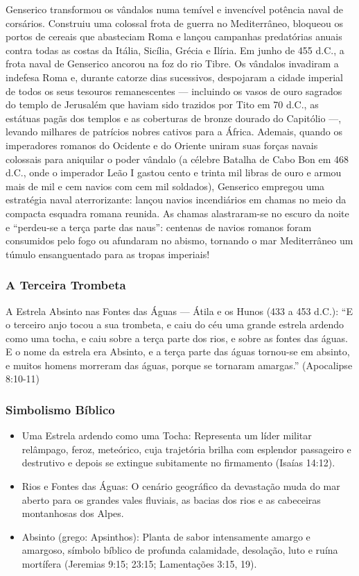 Genserico transformou os vândalos numa temível e invencível potência naval de corsários. Construiu uma colossal frota de guerra no Mediterrâneo, bloqueou os portos de cereais que abasteciam Roma e lançou campanhas predatórias anuais contra todas as costas da Itália, Sicília, Grécia e Ilíria.
Em junho de 455 d.C., a frota naval de Genserico ancorou na foz do rio Tibre. Os vândalos invadiram a indefesa Roma e, durante catorze dias sucessivos, despojaram a cidade imperial de todos os seus tesouros remanescentes — incluindo os vasos de ouro sagrados do templo de Jerusalém que haviam sido trazidos por Tito em 70 d.C., as estátuas pagãs dos templos e as coberturas de bronze dourado do Capitólio —, levando milhares de patrícios nobres cativos para a África.
Ademais, quando os imperadores romanos do Ocidente e do Oriente uniram suas forças navais colossais para aniquilar o poder vândalo (a célebre Batalha de Cabo Bon em 468 d.C., onde o imperador Leão I gastou cento e trinta mil libras de ouro e armou mais de mil e cem navios com cem mil soldados), Genserico empregou uma estratégia naval aterrorizante: lançou navios incendiários em chamas no meio da compacta esquadra romana reunida. As chamas alastraram-se no escuro da noite e ``perdeu-se a terça parte das naus'': centenas de navios romanos foram consumidos pelo fogo ou afundaram no abismo, tornando o mar Mediterrâneo um túmulo ensanguentado para as tropas imperiais!


\subsubsection*{A Terceira Trombeta}
A Estrela Absinto nas Fontes das Águas — Átila e os Hunos (433 a 453 d.C.):
``E o terceiro anjo tocou a sua trombeta, e caiu do céu uma grande estrela ardendo como uma tocha, e caiu sobre a terça parte dos rios, e sobre as fontes das águas. E o nome da estrela era Absinto, e a terça parte das águas tornou-se em absinto, e muitos homens morreram das águas, porque se tornaram amargas.'' (Apocalipse 8:10-11)


\subsubsection*{Simbolismo Bíblico}
\begin{itemize}
  \item Uma Estrela ardendo como uma Tocha: Representa um líder militar relâmpago, feroz, meteórico, cuja trajetória brilha com esplendor passageiro e destrutivo e depois se extingue subitamente no firmamento (Isaías 14:12).
  \item Rios e Fontes das Águas: O cenário geográfico da devastação muda do mar aberto para os grandes vales fluviais, as bacias dos rios e as cabeceiras montanhosas dos Alpes.
  \item Absinto (grego: Apsinthos): Planta de sabor intensamente amargo e amargoso, símbolo bíblico de profunda calamidade, desolação, luto e ruína mortífera (Jeremias 9:15; 23:15; Lamentações 3:15, 19).
\end{itemize}



